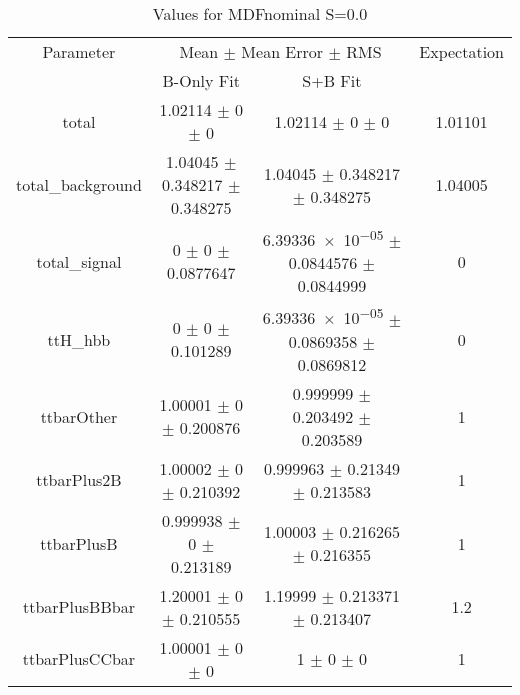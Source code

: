 \begin{table}
\centering
\caption{Values for MDFnominal S=0.0}
\begin{tabular}{cccc}
\toprule
Parameter & \multicolumn{2}{c}{Mean $\pm$ Mean Error $\pm$ RMS} & Expectation\\
 & B-Only Fit & S+B Fit & \\
\midrule
total & \num{1.02114} $\pm$ \num{0} $\pm$ \num{0} & \num{1.02114} $\pm$ \num{0} $\pm$ \num{0} & \num{1.01101}\\
total\_background & \num{1.04045} $\pm$ \num{0.348217} $\pm$ \num{0.348275} & \num{1.04045} $\pm$ \num{0.348217} $\pm$ \num{0.348275} & \num{1.04005}\\
total\_signal & \num{0} $\pm$ \num{0} $\pm$ \num{0.0877647} & \num{6.39336e-05} $\pm$ \num{0.0844576} $\pm$ \num{0.0844999} & \num{0}\\
ttH\_hbb & \num{0} $\pm$ \num{0} $\pm$ \num{0.101289} & \num{6.39336e-05} $\pm$ \num{0.0869358} $\pm$ \num{0.0869812} & \num{0}\\
ttbarOther & \num{1.00001} $\pm$ \num{0} $\pm$ \num{0.200876} & \num{0.999999} $\pm$ \num{0.203492} $\pm$ \num{0.203589} & \num{1}\\
ttbarPlus2B & \num{1.00002} $\pm$ \num{0} $\pm$ \num{0.210392} & \num{0.999963} $\pm$ \num{0.21349} $\pm$ \num{0.213583} & \num{1}\\
ttbarPlusB & \num{0.999938} $\pm$ \num{0} $\pm$ \num{0.213189} & \num{1.00003} $\pm$ \num{0.216265} $\pm$ \num{0.216355} & \num{1}\\
ttbarPlusBBbar & \num{1.20001} $\pm$ \num{0} $\pm$ \num{0.210555} & \num{1.19999} $\pm$ \num{0.213371} $\pm$ \num{0.213407} & \num{1.2}\\
ttbarPlusCCbar & \num{1.00001} $\pm$ \num{0} $\pm$ \num{0} & \num{1} $\pm$ \num{0} $\pm$ \num{0} & \num{1}\\
\bottomrule
\end{tabular}
\end{table}